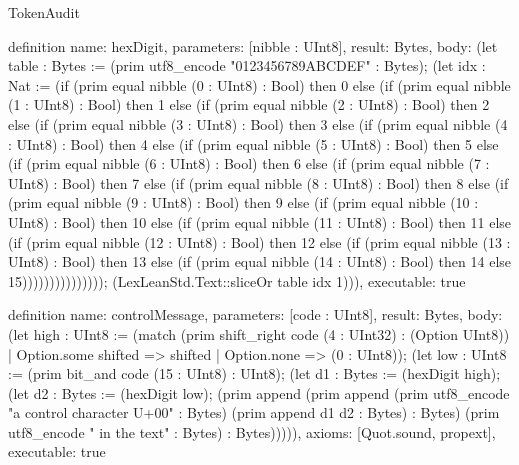 \begin{lexlean}{TokenAudit}
\begin{semanticmodule}
definition{
  name: hexDigit,
  parameters: [nibble : UInt8],
  result: Bytes,
  body: (let table : Bytes := (prim utf8_encode "0123456789ABCDEF" : Bytes); (let idx : Nat := (if (prim equal nibble (0 : UInt8) : Bool) then 0 else (if (prim equal nibble (1 : UInt8) : Bool) then 1 else (if (prim equal nibble (2 : UInt8) : Bool) then 2 else (if (prim equal nibble (3 : UInt8) : Bool) then 3 else (if (prim equal nibble (4 : UInt8) : Bool) then 4 else (if (prim equal nibble (5 : UInt8) : Bool) then 5 else (if (prim equal nibble (6 : UInt8) : Bool) then 6 else (if (prim equal nibble (7 : UInt8) : Bool) then 7 else (if (prim equal nibble (8 : UInt8) : Bool) then 8 else (if (prim equal nibble (9 : UInt8) : Bool) then 9 else (if (prim equal nibble (10 : UInt8) : Bool) then 10 else (if (prim equal nibble (11 : UInt8) : Bool) then 11 else (if (prim equal nibble (12 : UInt8) : Bool) then 12 else (if (prim equal nibble (13 : UInt8) : Bool) then 13 else (if (prim equal nibble (14 : UInt8) : Bool) then 14 else 15))))))))))))))); (LexLeanStd.Text::sliceOr table idx 1))),
  executable: true
}

definition{
  name: controlMessage,
  parameters: [code : UInt8],
  result: Bytes,
  body: (let high : UInt8 := (match (prim shift_right code (4 : UInt32) : (Option UInt8))
    | Option.some shifted => shifted
    | Option.none => (0 : UInt8)); (let low : UInt8 := (prim bit_and code (15 : UInt8) : UInt8); (let d1 : Bytes := (hexDigit high); (let d2 : Bytes := (hexDigit low); (prim append (prim append (prim utf8_encode "a control character U+00" : Bytes) (prim append d1 d2 : Bytes) : Bytes) (prim utf8_encode " in the text" : Bytes) : Bytes))))),
  axioms: [Quot.sound, propext],
  executable: true
}


\end{semanticmodule}
\end{lexlean}
